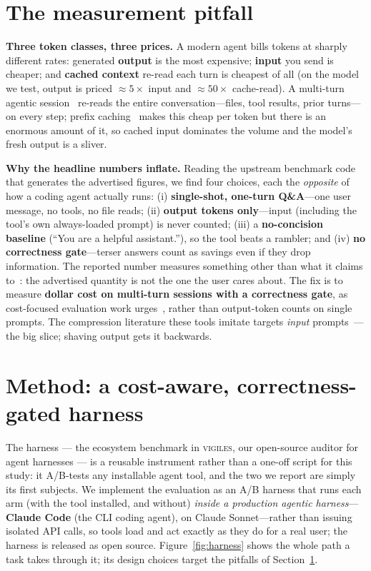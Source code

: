 \section{The measurement pitfall}
\label{sec:pitfall}
\textbf{Three token classes, three prices.} A modern agent bills tokens at sharply different rates:
generated \textbf{output} is the most expensive; \textbf{input} you send is cheaper; and
\textbf{cached context} re-read each turn is cheapest of all (on the model we test, output is priced
${\approx}5\times$ input and ${\approx}50\times$ cache-read). A multi-turn agentic
session~\cite{yang2024sweagent} re-reads the entire conversation---files, tool results, prior
turns---on every step; prefix caching~\cite{zheng2024sglang} makes this cheap per token but there is
an enormous amount of it, so cached input dominates the volume and the model's fresh output is a
sliver.

\textbf{Why the headline numbers inflate.} Reading the upstream benchmark code that generates the
advertised figures, we find four choices, each the \emph{opposite} of how a coding agent actually runs: (i)
\textbf{single-shot, one-turn Q\&A}---one user message, no tools, no file reads; (ii) \textbf{output
tokens only}---input (including the tool's own always-loaded prompt) is never counted; (iii) a
\textbf{no-concision baseline} (``You are a helpful assistant.''), so the tool beats a rambler; and
(iv) \textbf{no correctness gate}---terser answers count as savings even if they drop information.
The reported number measures something other than what it claims
to~\cite{raji2021benchmark,jacobs2021measurement}: the advertised quantity is not the one the user
cares about. The fix is to measure \textbf{dollar cost on multi-turn sessions with a correctness
gate}, as cost-focused evaluation work urges~\cite{chen2023frugalgpt,liang2023helm,schwartz2020greenai},
rather than output-token counts on single prompts. The compression literature these tools imitate
targets \emph{input} prompts~\cite{jiang2023llmlingua}---the big slice; shaving output gets it backwards.

\section{Method: a cost-aware, correctness-gated harness}
\label{sec:method}
The harness --- the ecosystem benchmark in \textsc{vigiles}, our open-source auditor for agent
harnesses --- is a reusable instrument rather than a
one-off script for this study: it A/B-tests any installable agent tool, and the two we report are
simply its first subjects. We implement the evaluation as an A/B harness that runs each arm (with the tool installed, and
without) \emph{inside a production agentic harness}---\textbf{Claude Code} (the CLI coding agent), on Claude Sonnet---rather than issuing isolated
API calls, so tools load and act exactly as they do for a real user; the harness is released as open
source. Figure~\ref{fig:harness} shows the whole path a task takes through it; its design choices
target the pitfalls of Section~\ref{sec:pitfall}.

